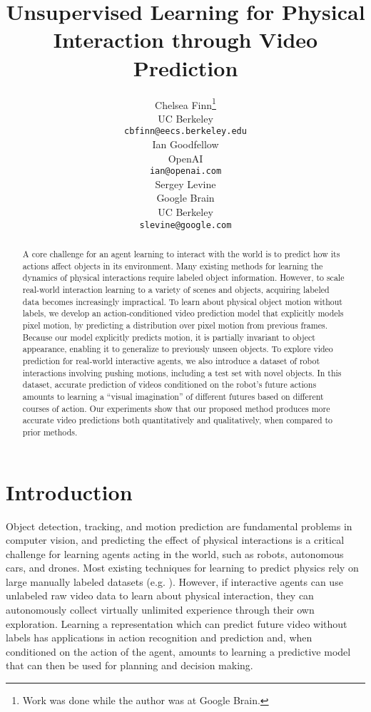 \documentclass{article}
\title{Unsupervised Learning for Physical Interaction through Video Prediction}
\author{
    Chelsea Finn\thanks{Work was done while the author was at Google Brain.}\\
  UC Berkeley\\
  \texttt{cbfinn@eecs.berkeley.edu}\\
  \And
  Ian Goodfellow\\
  OpenAI\\
  \texttt{ian@openai.com}\\
  \And
  Sergey Levine\\
  Google Brain\\
  UC Berkeley\\
  \texttt{slevine@google.com}\\
}
\begin{document}
\maketitle

\begin{abstract}

A core challenge for an agent learning to interact with the world is to predict how its actions affect objects in its environment.
Many existing methods for learning the dynamics of physical interactions require labeled object
information. However, to scale real-world interaction learning
to a variety of scenes and objects, acquiring labeled data becomes increasingly impractical.
To learn about physical object motion without labels, we develop an action-conditioned video
prediction model that explicitly models pixel motion, by predicting a distribution over pixel motion from previous frames.
Because our model explicitly predicts motion, it is partially invariant to object appearance, enabling it to generalize to previously unseen objects.
To explore video prediction for real-world interactive agents, we also introduce a dataset of  robot interactions involving
pushing motions, including a test set with novel objects. In this dataset, accurate prediction of videos conditioned on the robot's future actions
amounts to learning a ``visual imagination'' of different futures based on different courses of action.
Our experiments show that our proposed method produces more accurate
video predictions both quantitatively and qualitatively, when compared to prior methods.










\end{abstract}

\section{Introduction}
\label{intro}

Object detection, tracking, and motion prediction are fundamental problems in computer vision, and
predicting the effect of physical interactions is a critical challenge for learning agents acting in the world, such as robots, autonomous cars,
and drones. Most existing techniques for learning to predict physics rely on large manually labeled datasets (e.g. \cite{mbrf-niu-15}).
However, if interactive agents can use unlabeled raw video data to learn about physical interaction, they can autonomously collect virtually unlimited experience through their own exploration.
Learning a representation which can predict future video without labels has applications in action recognition and prediction and, when conditioned on the action of the agent,
amounts to learning a predictive model that can then be used for planning and decision making.
\end{document}
